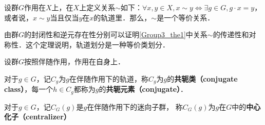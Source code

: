\begin{theorem}{}\label{Group3_the1}
设群$G$作用在$X$上，在$X$上定义关系$\sim$如下：$\forall x, y\in X, x\sim y \iff \exists g\in G, g\cdot x=y$，或者说，$x\sim y$当且仅当$y$在$x$的轨道里．那么，$\sim$是一个等价关系．
\end{theorem}

由群$G$的封闭性和逆元存在性分别可以证明\autoref{Group3_the1}中关系$\sim$的传递性和对称性．这个定理说明，轨道划分是一种等价类划分．

\begin{definition}{}
设群$G$按照伴随作用，作用在自身上．

对于$g\in G$，记$C_g$为$g$在伴随作用下的轨道，称$C_g$为$g$的\textbf{共轭类（conjugate class）}，每一个$h\in C_g$都称为$g$的\textbf{共轭元素（conjugate）}．

对于$g\in G$，记$C_G(g)$是$g$在伴随作用下的迷向子群， 称$C_G(g)$为$g$在$G$中的\textbf{中心化子（centralizer）}
\end{definition}